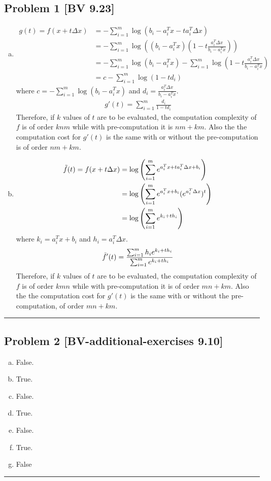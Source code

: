 \documentclass[12pt, letterpaper, twoside]{article}
\begin{document}
\subsection*{Problem 1 \small[BV 9.23]}
\begin{enumerate}[(a)]
    \item 
    \begin{align*}
        g(t)=f(x+t\Delta x)
        &=-\sum_{i=1}^m\log(b_i-a_i^Tx-ta_i^T\Delta x)\\
        &=-\sum_{i=1}^m\log\left((b_i-a_i^Tx)(1-t\frac{a_i^T\Delta x}{b_i-a_i^Tx})\right)\\
        &=-\sum_{i=1}^m\log(b_i-a_i^Tx) - \sum_{i=1}^m\log(1-t\frac{a_i^T\Delta x}{b_i-a_i^Tx})\\
        &=c-\sum_{i=1}^m\log(1-td_i)
    \end{align*}
    where $c=-\sum_{i=1}^m\log(b_i-a_i^Tx)$ and $d_i=\frac{a_i^T\Delta x}{b_i-a_i^Tx}$.
    \begin{align*}
        g'(t)=\sum_{i=1}^m\frac{d_i}{1-td_i}
    \end{align*}
    Therefore, if $k$ values of $t$ are to be evaluated, the computation complexity of $f$ is of order $knm$ while with pre-computation it is $nm+km$. Also the the computation cost for $g'(t)$ is the same with or without the pre-computation is of order $nm+km$.
    
    \item
    \begin{align*}
        \Tilde{f}(t)=f(x+t\Delta x)
        &=\log\left(\sum_{i=1}^me^{a_i^Tx+ta_i^T\Delta x+b_i}\right)\\
        &=\log\left(\sum_{i=1}^me^{a_i^Tx+b_i}(e^{a_i^T\Delta x})^t\right)\\
        &=\log\left(\sum_{i=1}^me^{k_i+th_i}\right)
    \end{align*}
    where $k_i=a_i^Tx+b_i$ and $h_i=a_i^T\Delta x$.
    \begin{align*}
        \Tilde{f}'(t)=\frac{\sum_{i=1}^mh_ie^{k_i+th_i}}{\sum_{i=1}^me^{k_i+th_i}}
    \end{align*}
    Therefore, if $k$ values of $t$ are to be evaluated, the computation complexity of $f$ is of order $kmn$ while with pre-computation it is of order $mn+km$. Also the the computation cost for $g'(t)$ is the same with or without the pre-computation, of order $mn+km$.
    
\end{enumerate}
\hrule

\subsection*{Problem 2 \small[BV-additional-exercises 9.10]}
\begin{enumerate}[(a)]
    \item False.
    \item True.
    \item False.
    \item True.
    \item False.
    \item True.
    \item False
\end{enumerate}
\hrule
\end{document}
